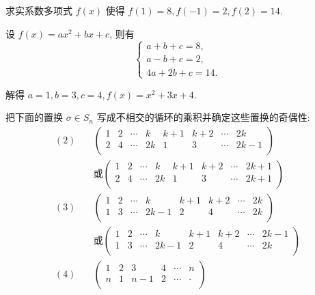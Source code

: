 \documentclass{ctexart}
\begin{document}
\begin{exercisec}[1.5.1]
    求实系数多项式 $f(x)$ 使得 $f(1)=8,f(-1)=2,f(2)=14$.
\end{exercisec}
\begin{solution}
    设 $f(x)=ax^2+bx+c$, 则有
    \[\begin{cases}
        a+b+c=8, \\
        a-b+c=2, \\
        4a+2b+c=14.
    \end{cases}\]

    解得 $a=1,b=3,c=4,f(x)=x^2+3x+4$.
\end{solution}
\begin{exercisec}[2.3.2, 2.3.5]
    把下面的置换 $\sigma\in S_n$ 写成不相交的循环的乘积并确定这些置换的奇偶性:
    \begin{align*}
        (2)\quad & \begin{pmatrix}
            1 & 2 & \cdots & k & k+1 & k+2 & \cdots & 2k \\
            2 & 4 & \cdots & 2k & 1 & 3 & \cdots & 2k-1 \\
        \end{pmatrix} \\
        & \text{或} \begin{pmatrix}
            1 & 2 & \cdots & k & k+1 & k+2 & \cdots & 2k+1 \\
            2 & 4 & \cdots & 2k & 1 & 3 & \cdots & 2k+1 \\
        \end{pmatrix} \\
        (3)\quad & \begin{pmatrix}
            1 & 2 & \cdots & k & k+1 & k+2 & \cdots & 2k \\
            1 & 3 & \cdots & 2k-1 & 2 & 4 & \cdots & 2k \\
        \end{pmatrix} \\
        & \text{或} \begin{pmatrix}
            1 & 2 & \cdots & k & k+1 & k+2 & \cdots & 2k-1 \\
            1 & 3 & \cdots & 2k-1 & 2 & 4 & \cdots & 2k \\
        \end{pmatrix} \\
        (4)\quad & \begin{pmatrix}
            1 & 2 & 3 & 4 & \cdots & n \\
            n & 1 & n-1 & 2 & \cdots & \cdot \\
        \end{pmatrix}
    \end{align*}
\end{exercisec}
\end{document}
